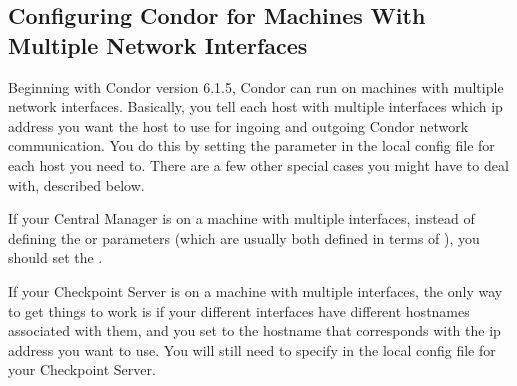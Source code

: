\subsection{\label{sec:Multiple-Interfaces}Configuring Condor for
Machines With Multiple Network Interfaces } 

Beginning with Condor version 6.1.5, Condor can run on machines with
multiple network interfaces.
Basically, you tell each host with multiple interfaces which ip
address you want the host to use for ingoing and outgoing Condor
network communication.
You do this by setting the  parameter in
the local config file for each host you need to.
There are a few other special cases you might have to deal with,
described below.

If your Central Manager is on a machine with multiple interfaces,
instead of defining the  or
 parameters (which are usually both defined in
terms of ), you should set the .

If your Checkpoint Server is on a machine with multiple interfaces,
the only way to get things to work is if your different interfaces
have different hostnames associated with them, and you set
 to the hostname that corresponds with the
ip address you want to use.  
You will still need to specify  in the local
config file for your Checkpoint Server.
